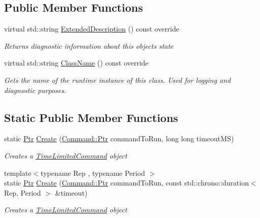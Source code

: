 \subsection*{Public Member Functions}
\begin{DoxyCompactItemize}
\item 
virtual std\+::string \mbox{\hyperlink{class_command_lib_1_1_time_limited_command_aaf7018c66b91a5d1a519325b99dc3f55}{Extended\+Description}} () const override
\begin{DoxyCompactList}\small\item\em Returns diagnostic information about this object\textquotesingle{}s state \end{DoxyCompactList}\item 
\mbox{\label{class_command_lib_1_1_time_limited_command_a2a5063ef124f555229b90f7bd82f362e}} 
virtual std\+::string \mbox{\hyperlink{class_command_lib_1_1_time_limited_command_a2a5063ef124f555229b90f7bd82f362e}{Class\+Name}} () const override
\begin{DoxyCompactList}\small\item\em Gets the name of the runtime instance of this class. Used for logging and diagnostic purposes.  \end{DoxyCompactList}\end{DoxyCompactItemize}
\subsection*{Static Public Member Functions}
\begin{DoxyCompactItemize}
\item 
static \mbox{\hyperlink{class_command_lib_1_1_command_a3b3e4f00144373299df5c6bb1acc319d}{Ptr}} \mbox{\hyperlink{class_command_lib_1_1_time_limited_command_a7b8515c4f2780c7f5d8bc942affbc12b}{Create}} (\mbox{\hyperlink{class_command_lib_1_1_command_a3b3e4f00144373299df5c6bb1acc319d}{Command\+::\+Ptr}} command\+To\+Run, long long timeout\+MS)
\begin{DoxyCompactList}\small\item\em Creates a \mbox{\hyperlink{class_command_lib_1_1_time_limited_command}{Time\+Limited\+Command}} object \end{DoxyCompactList}\item 
{\footnotesize template$<$typename Rep , typename Period $>$ }\\static \mbox{\hyperlink{class_command_lib_1_1_command_a3b3e4f00144373299df5c6bb1acc319d}{Ptr}} \mbox{\hyperlink{class_command_lib_1_1_time_limited_command_a14e7e2915d660199c4433972a93515e7}{Create}} (\mbox{\hyperlink{class_command_lib_1_1_command_a3b3e4f00144373299df5c6bb1acc319d}{Command\+::\+Ptr}} command\+To\+Run, const std\+::chrono\+::duration$<$ Rep, Period $>$ \&timeout)
\begin{DoxyCompactList}\small\item\em Creates a \mbox{\hyperlink{class_command_lib_1_1_time_limited_command}{Time\+Limited\+Command}} object \end{DoxyCompactList}\end{DoxyCompactItemize}
